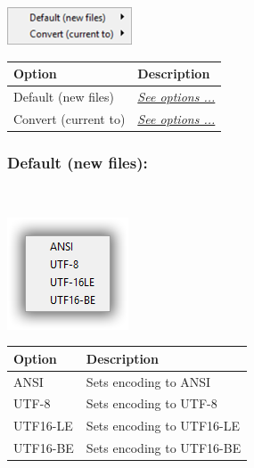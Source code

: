 \includegraphics[scale=0.8]{./res/menu_format_encoding.png}\\

\begin{scriptsize}
  \begin{tabularx}{\textwidth}{>{\hsize=0.4\hsize}X>{\hsize=0.6\hsize}X}\\
    \hline
    \textbf{Option} & \textbf{Description} \\
    \hline
    Default (new files) & \textit{\href{\#menu\_format\_encoding\_default}{See options ...}} \\
    Convert (current to) & \textit{\href{\#menu\_format\_encoding\_convert}{See options ...}} \\
    \hline
  \end{tabularx}
\end{scriptsize}


\hypertarget{menu_format_encoding_default}{}
\subsubsection{Default (new files):}\\

\includegraphics[scale=0.8]{./res/encoding.png}\\

\begin{scriptsize}
  \begin{tabularx}{\textwidth}{>{\hsize=0.3\hsize}X>{\hsize=0.7\hsize}X}\\
    \hline
    \textbf{Option} & \textbf{Description} \\
    \hline
    ANSI & Sets encoding to ANSI \\
    UTF-8 & Sets encoding to UTF-8 \\
    UTF16-LE & Sets encoding to UTF16-LE \\
    UTF16-BE & Sets encoding to UTF16-BE \\
    \hline
  \end{tabularx}
\end{scriptsize}


